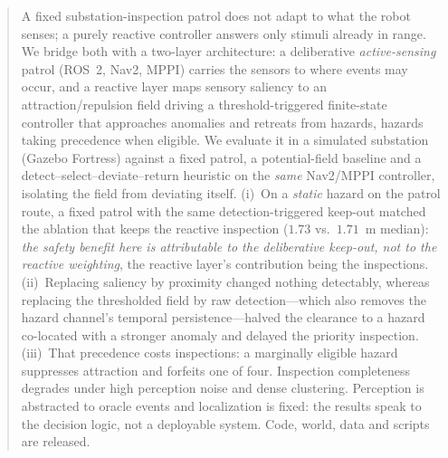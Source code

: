 \documentclass{ieeeaccess}
\begin{document}
\begin{abstract}
A fixed substation-inspection patrol does not adapt to what the robot senses; a purely
reactive controller answers only stimuli already in range. We bridge both with a
two-layer architecture: a deliberative \emph{active-sensing} patrol (ROS~2, Nav2,
MPPI) carries the sensors to where events may occur, and a reactive layer maps sensory
saliency to an attraction/repulsion field driving a threshold-triggered finite-state
controller that approaches anomalies and retreats from hazards, hazards taking
precedence when eligible. We evaluate it in a simulated substation (Gazebo Fortress)
against a fixed patrol, a potential-field baseline and a
detect--select--deviate--return heuristic on the \emph{same} Nav2/MPPI controller,
isolating the field from deviating itself. (i)~On a \emph{static} hazard on the patrol
route, a fixed patrol with the same detection-triggered keep-out matched the ablation
that keeps the reactive inspection ($1.73$ vs.\ $1.71$~m median): \emph{the safety
benefit here is attributable to the deliberative keep-out, not to the reactive
weighting}, the reactive layer's contribution being the inspections.
(ii)~Replacing saliency by proximity changed nothing detectably, whereas replacing the
thresholded field by raw detection---which also removes the hazard channel's temporal
persistence---halved the clearance to a hazard co-located with a stronger anomaly and
delayed the priority inspection. (iii)~That precedence costs inspections: a marginally
eligible hazard suppresses attraction and forfeits one of four. Inspection
completeness degrades under high perception noise and dense clustering. Perception is
abstracted to oracle events and localization is fixed: the results speak to the
decision logic, not a deployable system. Code, world, data and scripts are released.
\end{abstract}
\end{document}
